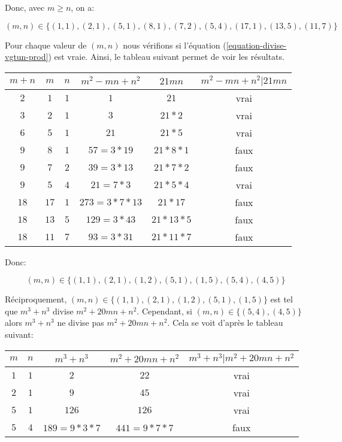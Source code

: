 \documentclass[12pt,a4paper,article]{memoir}
\begin{document}
Donc, avec $m \geq n$, on a: 

\[(m, n) \in \{(1,1), (2, 1), (5, 1), (8, 1), (7, 2), (5, 4), (17, 1), (13, 5), (11, 7)\} \]

Pour chaque valeur de $(m, n)$ nous vérifions si l'équation (\ref{equation-divise-vgtun-prod}) est vraie. Ainsi, le tableau suivant permet de voir les résultats.

\bigskip

\begin{tabular}{|c|c|c|c|c|c|}
\hline 
$m + n$ & $m$ & $n$ & $m^2 - mn + n^2$ & $21mn$ & $m^2 - mn + n^2 | 21mn$\\ \hline                        
$2$ & $1$ & $1$ & $1$ &  $21$ & vrai \\
$3$ & $2$ & $1$ & $3$ &  $21*2$ & vrai \\
$6$ & $5$ & $1$ & $21$ &  $21*5$ & vrai \\
$9$ & $8$ & $1$ & $57=3*19$ &  $21*8*1$ & faux \\
$9$ & $7$ & $2$ & $39=3*13$ &  $21*7*2$ & faux \\
$9$ & $5$ & $4$ & $21=7*3$ &  $21*5*4$ & vrai \\
$18$ & $17$ & $1$ & $273=3*7*13$ &  $21*17$ & faux \\
$18$ & $13$ & $5$ & $129=3*43$ &  $21*13*5$ & faux \\
$18$ & $11$ & $7$ & $93=3*31$ &  $21*11*7$ & faux \\
\hline
\end{tabular}

\bigskip

Donc:

\begin{equation}
(m, n) \in \{(1,1), (2, 1), (1, 2), (5, 1), (1, 5), (5, 4), (4, 5) \}
\label{equation-pb-2-sol-1-impl}
\end{equation}

\bigskip

Réciproquement, $(m,n) \in \{(1,1), (2, 1), (1, 2), (5, 1), (1, 5)\}$ est tel que $m^3+n^3$ divise $m^2+20mn+n^2$. Cependant, 
si $(m,n) \in \{(5, 4), (4, 5)\}$ alors $m^3+n^3$ ne divise pas $m^2+20mn+n^2$. Cela se voit d'après le tableau suivant:

\bigskip

\begin{tabular}{|c|c|c|c|c|}
\hline 
$m$ & $n$ & $m^3 + n^3$ & $m^2 + 20mn + n^2$ & $m^3+n^3 | m^2 + 20mn + n^2$\\ \hline                        
$1$ & $1$ & $2$ & $22$ & vrai \\
$2$ & $1$ & $9$ & $45$ & vrai \\
$5$ & $1$ & $126$ & $126$ & vrai \\
$5$ & $4$ & $189=9*3*7$ & $441=9*7*7$ & faux \\
\hline
\end{tabular}
\end{document}
